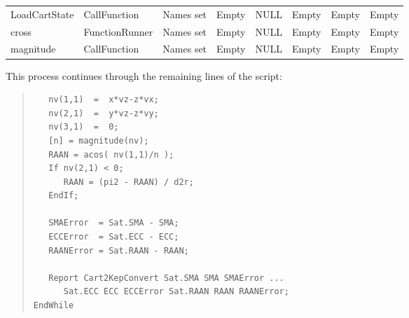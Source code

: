 \begin{center}
\begin{small}
\tablelasttail{\hline}
\begin{supertabular}{|l|l|m{0.56in}|m{0.55in}|m{0.55in}|m{0.55in}|m{0.55in}|m{0.55in}|}
LoadCartState & CallFunction & Names set & Empty & NULL & Empty & Empty & Empty\\
cross & Function\-Runner & Names set & Empty & NULL & Empty & Empty & Empty\\
magnitude & CallFunction & Names set & Empty & NULL & Empty & Empty & Empty\\
\end{supertabular}
\end{small}
\end{center}

This process continues through the remaining lines of the script:

\begin{quote}
\begin{verbatim}
   nv(1,1)  =  x*vz-z*vx;
   nv(2,1)  =  y*vz-z*vy;
   nv(3,1)  =  0;
   [n] = magnitude(nv);
   RAAN = acos( nv(1,1)/n );
   If nv(2,1) < 0;
      RAAN = (pi2 - RAAN) / d2r;
   EndIf;

   SMAError  = Sat.SMA - SMA;
   ECCError  = Sat.ECC - ECC;
   RAANError = Sat.RAAN - RAAN;

   Report Cart2KepConvert Sat.SMA SMA SMAError ...
      Sat.ECC ECC ECCError Sat.RAAN RAAN RAANError;
EndWhile
\end{verbatim}
\end{quote}


